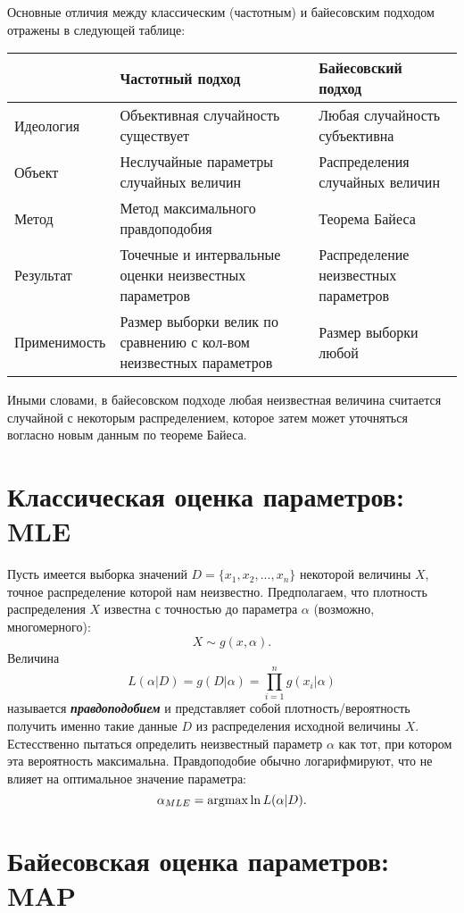 Основные отличия между классическим (частотным) и байесовским подходом отражены в следующей таблице:

\begin{tabular}{ p{3cm}|p{6cm}|p{5cm} }
          & Частотный подход & Байесовский подход \\ \hline 
Идеология & Объективная случайность существует & Любая случайность субъективна \\
Объект    & Неслучайные параметры случайных величин & Распределения случайных величин \\
Метод     & Метод максимального правдоподобия & Теорема Байеса \\
Результат & Точечные и интервальные оценки неизвестных параметров & Распределение неизвестных параметров \\
Применимость & Размер выборки велик по сравнению с кол-вом неизвестных параметров & Размер выборки любой \\ \hline
\end{tabular}

Иными словами, в байесовском подходе любая неизвестная величина считается случайной с некоторым распределением, которое затем может уточняться вогласно новым данным по теореме Байеса. 

\section{Классическая оценка параметров: MLE}

Пусть имеется выборка значений $D = \{x_1, x_2, ..., x_n\}$ некоторой величины $X$, точное распределение которой нам неизвестно. Предполагаем, что плотность распределения $X$ известна с точностью до параметра $\alpha$ (возможно, многомерного): 
$$
X \sim g(x, \alpha).
$$
Величина
$$
L(\alpha|D) = g(D | \alpha) = \prod_{i=1}^n g(x_i | \alpha)
$$
называется \textbf{\textit{правдоподобием}} и представляет собой плотность/вероятность получить именно такие данные $D$ из распределения исходной величины $X$. Естесственно пытаться определить неизвестный параметр $\alpha$ как тот, при котором эта вероятность максимальна. Правдоподобие обычно логарифмируют, что не влияет на оптимальное значение параметра:
$$
\alpha_{MLE} = \operatorname*{argmax}{\ln{L(\alpha|D)}}.
$$


\section{Байесовская оценка параметров: MAP}

